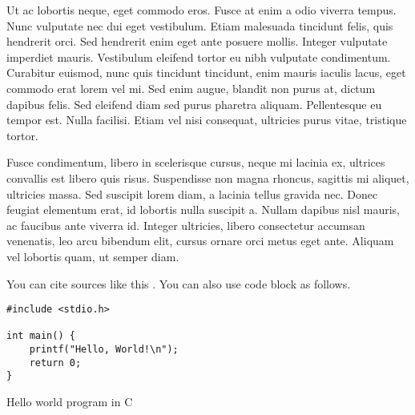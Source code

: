 Ut ac lobortis neque, eget commodo eros. Fusce at enim a odio viverra tempus. Nunc vulputate nec dui eget vestibulum. Etiam malesuada tincidunt felis, quis hendrerit orci. Sed hendrerit enim eget ante posuere mollis. Integer vulputate imperdiet mauris. Vestibulum eleifend tortor eu nibh vulputate condimentum. Curabitur euismod, nunc quis tincidunt tincidunt, enim mauris iaculis lacus, eget commodo erat lorem vel mi. Sed enim augue, blandit non purus at, dictum dapibus felis. Sed eleifend diam sed purus pharetra aliquam. Pellentesque eu tempor est. Nulla facilisi. Etiam vel nisi consequat, ultricies purus vitae, tristique tortor.

Fusce condimentum, libero in scelerisque cursus, neque mi lacinia ex, ultrices convallis est libero quis risus. Suspendisse non magna rhoncus, sagittis mi aliquet, ultricies massa. Sed suscipit lorem diam, a lacinia tellus gravida nec. Donec feugiat elementum erat, id lobortis nulla suscipit a. Nullam dapibus nisl mauris, ac faucibus ante viverra id. Integer ultricies, libero consectetur accumsan venenatis, leo arcu bibendum elit, cursus ornare orci metus eget ante. Aliquam vel lobortis quam, ut semper diam. 

You can cite sources like this \cite{knuth1984}. You can also use code block as follows.

\begin{listing}[ht]
\begin{verbatim}
#include <stdio.h>

int main() {
    printf("Hello, World!\n");
    return 0;
}
\end{verbatim}
\caption{Hello world program in C}
\label{lst:hello-c}
\end{listing}
